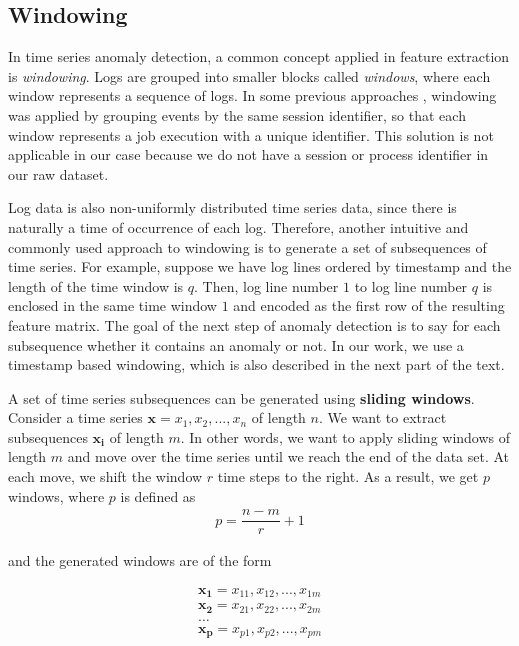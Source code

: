 \subsection{Windowing}

In time series anomaly detection, a common concept applied in feature extraction is \textit{windowing}. 
Logs are grouped into smaller blocks called \textit{windows}, where each window represents a sequence of logs. In some previous approaches \cite{xu2009}, windowing was applied by grouping events by the same session identifier, so that each window represents a job execution with a unique identifier. This solution is not applicable in our case because we do not have a session or process identifier in our raw dataset.

Log data is also non-uniformly distributed time series data, since there is naturally a time of occurrence of each log. Therefore, another intuitive and commonly used approach to windowing is to generate a set of subsequences of time series. For example, suppose we have log lines ordered by timestamp and the length of the time window is $q$. Then, log line number $1$ to log line number $q$ is enclosed in the same time window $1$ and encoded as the first row of the resulting feature matrix. The goal of the next step of anomaly detection is to say for each subsequence whether it contains an anomaly or not. In our work, we use a timestamp based windowing, which is also described in the next part of the text.

A set of time series subsequences can be generated using \textbf{sliding windows}. Consider a time series $\mathbf{x} = x_1, x_2, ..., x_n$ of length $n$. We want to extract subsequences $\mathbf{x_i}$ of length $m$. In other words, we want to apply sliding windows of length $m$ and move over the time series until we reach the end of the data set. At each move, we shift the window $r$ time steps to the right. As a result, we get $p$ windows, where $p$ is defined as
    \begin{gather*}
        p = \dfrac{n - m}{r} + 1
    \end{gather*}

and the generated windows are of the form 

\begin{gather*}
    \mathbf{x_1} = x_{11}, x_{12},..., x_{1m} \\
    \mathbf{x_2} = x_{21}, x_{22},..., x_{2m} \\
    \ldots\\
    \mathbf{x_p} = x_{p1}, x_{p2},..., x_{pm} 
\end{gather*}

